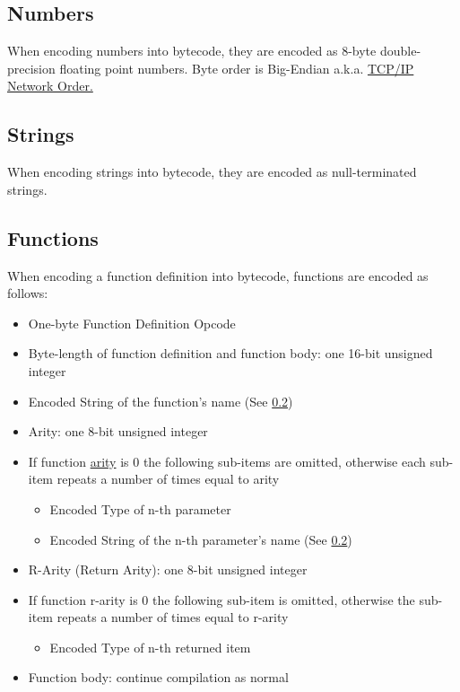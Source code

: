 \documentclass{article}
\begin{document}
\subsection{Numbers}
When encoding numbers into bytecode, they are encoded as 8-byte double-precision floating point numbers. Byte order is Big-Endian a.k.a. \href{https://www.rfc-editor.org/rfc/rfc1700}{TCP/IP Network Order.}

\subsection{Strings} \label{ssec:stringencode}
When encoding strings into bytecode, they are encoded as null-terminated strings.

\subsection{Functions}
When encoding a function definition into bytecode, functions are encoded as follows:
\begin{itemize}
	\item One-byte Function Definition Opcode
	\item Byte-length of function definition and function body: one 16-bit unsigned integer
	\item Encoded String of the function's name (See \ref{ssec:stringencode})
	\item Arity: one 8-bit unsigned integer
	\item If function \href{https://en.wikipedia.org/wiki/Arity}{arity} is 0 the following sub-items are omitted, otherwise each sub-item repeats a number of times equal to arity
		\begin{itemize}
			\item Encoded Type of n-th parameter
			\item Encoded String of the n-th parameter's name (See \ref{ssec:stringencode})
		\end{itemize}
	\item R-Arity (Return Arity): one 8-bit unsigned integer
	\item If function r-arity is 0 the following sub-item is omitted, otherwise the sub-item repeats a number of times equal to r-arity
		\begin{itemize}
			\item Encoded Type of n-th returned item
		\end{itemize}
	\item Function body: continue compilation as normal
\end{itemize}
\end{document}
